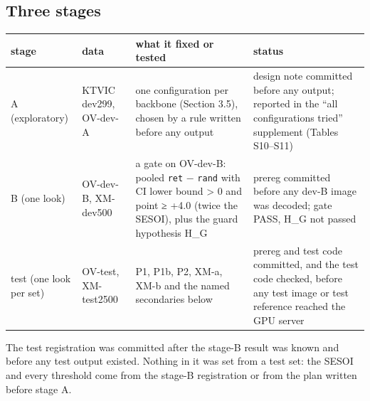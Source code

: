 \subsection{Three stages}\label{three-stages}

\begin{longtable}[]{@{}
  >{\raggedright\arraybackslash}p{}
  >{\raggedright\arraybackslash}p{}
  >{\raggedright\arraybackslash}p{}
  >{\raggedright\arraybackslash}p{}@{}}
\toprule\noalign{}
\begin{minipage}[b]{\linewidth}\raggedright
stage
\end{minipage} & \begin{minipage}[b]{\linewidth}\raggedright
data
\end{minipage} & \begin{minipage}[b]{\linewidth}\raggedright
what it fixed or tested
\end{minipage} & \begin{minipage}[b]{\linewidth}\raggedright
status
\end{minipage} \\
\midrule\noalign{}
\endhead
\bottomrule\noalign{}
\endlastfoot
A (exploratory) & KTVIC dev299, OV-dev-A & one configuration per backbone (Section 3.5), chosen by a
rule written before any output & design note committed before any output; reported in the ``all
configurations tried'' supplement (Tables S10--S11) \\
B (one look) & OV-dev-B, XM-dev500 & a gate on OV-dev-B: pooled \texttt{ret} − \texttt{rand} with CI
lower bound \textgreater{} 0 and point ≥ +4.0 (twice the SESOI), plus the guard hypothesis H\_G &
prereg committed before any dev-B image was decoded; gate PASS, H\_G not passed \\
test (one look per set) & OV-test, XM-test2500 & P1, P1b, P2, XM-a, XM-b and the named secondaries
below & prereg and test code committed, and the test code checked, before any test image or test
reference reached the GPU server \\
\end{longtable}

The test registration was committed after the stage-B result was known and before any test output
existed. Nothing in it was set from a test set: the SESOI and every threshold come from the stage-B
registration or from the plan written before stage A.

